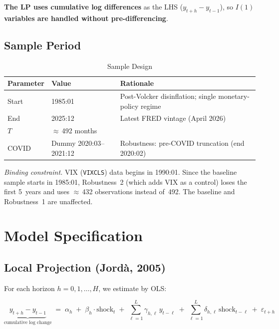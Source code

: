 \documentclass[11pt,a4paper]{article}
\begin{document}
\noindent \textbf{The LP uses cumulative log differences} as the LHS ($y_{t+h} - y_{t-1}$), so \textbf{$I(1)$ variables are handled without pre-differencing}.

\subsection{Sample Period}

\begin{table}[H]
\centering
\caption{Sample Design}
\label{tab:sample}
\begin{tabular}{@{}l l p{10cm}@{}}
\toprule
\textbf{Parameter} & \textbf{Value} & \textbf{Rationale} \\
\midrule
Start & 1985:01 & Post-Volcker disinflation; single monetary-policy regime \\
End   & 2025:12 & Latest FRED vintage (April 2026) \\
$T$   & $\approx$\,492 months & \\
COVID & Dummy 2020:03--2021:12 & Robustness: pre-COVID truncation (end 2020:02) \\
\bottomrule
\end{tabular}
\end{table}

\noindent\textit{Binding constraint.} VIX (\texttt{VIXCLS}) data begins in 1990:01. Since the baseline sample starts in 1985:01, Robustness~2 (which adds VIX as a control) loses the first 5~years and uses $\approx$\,432 observations instead of~492. The baseline and Robustness~1 are unaffected.

\section{Model Specification}

\subsection{Local Projection (Jord\`a, 2005)}

For each horizon $h = 0, 1, \ldots, H$, we estimate by OLS:

\begin{equation}
\underbrace{y_{t+h} - y_{t-1}}_{\text{cumulative log change}}
\;=\;
\alpha_h
\;+\;
\beta_h \cdot \text{shock}_t
\;+\;
\sum_{\ell=1}^{L} \gamma_{h,\ell}\, y_{t-\ell}
\;+\;
\sum_{\ell=1}^{L} \delta_{h,\ell}\, \text{shock}_{t-\ell}
\;+\;
\varepsilon_{t+h}
\label{eq:lp}
\end{equation}
\end{document}
